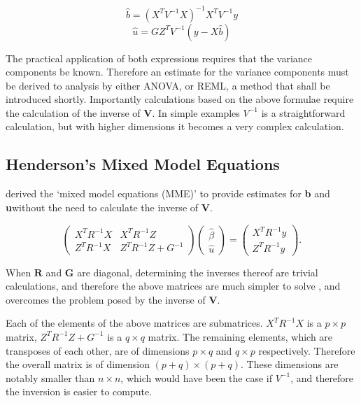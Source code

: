 \documentclass[12pt, a4paper]{report}
\theoremstyle{plain}
\theoremstyle{definition}
\theoremstyle{remark}
\begin{document}
\begin{equation}
\hat{b} = (X^{T}V^{-1}X)^{-1}X^{T}V^{-1}y
\end{equation}
\begin{equation}
\hat{u} = GZ^{T}V^{-1}(y-X\hat{b})
\end{equation}

The practical application of both expressions requires that the
variance components be known. Therefore an estimate for the
variance components must be derived to analysis by either ANOVA,
or REML, a method that shall be introduced shortly. Importantly
calculations based on the above formulae require the calculation
of the inverse of \textbf{V}. In simple examples $V^{-1}$ is a
straightforward calculation, but with higher dimensions it becomes
a very complex calculation.



\subsection{Henderson's Mixed Model Equations}
\citet{Henderson50, Henderson63, Henderson73, Henderson84a}
derived the `mixed model equations (MME)' to provide estimates for
\textbf{b} and \textbf{u}without the need to calculate the inverse
of \textbf{V}.

\begin{equation}
\left(\begin{matrix}
X^{T}R^{-1}X  & X^{T}R^{-1}Z \\
Z^{T}R^{-1}X  & Z^{T}R^{-1}Z + G^{-1}
\end{matrix}\right) \left(\begin{array}{c}
\hat{\beta}  \\
\hat{u}\end{array} \right) = \left(  \begin{array}{c}
X^{T}R^{-1}y  \\
Z^{T}R^{-1}y  \end{array} \right).
\end{equation}

When $\textbf{R}$ and $\textbf{G}$  are diagonal, determining the
inverses thereof are trivial calculations, and therefore the above
matrices are much simpler to solve , and overcomes the problem
posed by the inverse of \textbf{V}.

Each of the elements of the above matrices are submatrices.
$X^{T}R^{-1}X$ is a $p \times p$ matrix, $Z^{T}R^{-1}Z + G^{-1}$
is a $q \times q$ matrix. The remaining elements, which are
transposes of each other, are of dimensions $p \times q$ and $q
\times p$ respectively. Therefore the overall matrix is of
dimension $(p+q) \times (p+q)$. These dimensions are notably
smaller than $n \times n$, which would have been the case if
$V^{-1}$, and therefore the inversion is easier to compute.
\end{document}
